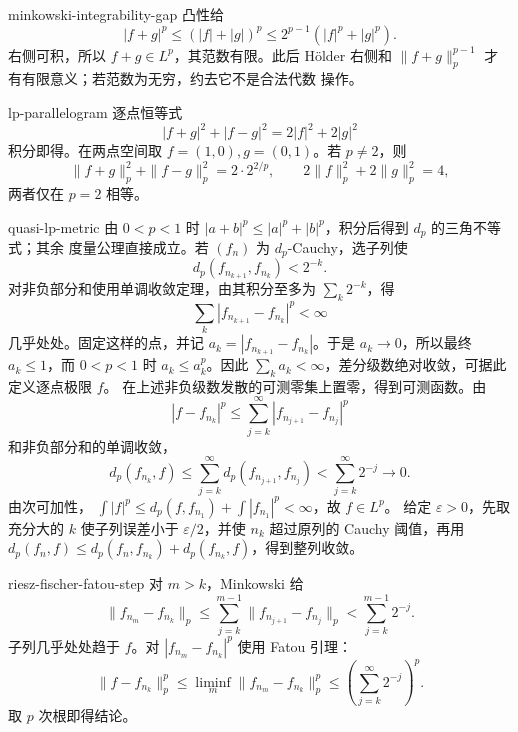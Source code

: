 \begin{solution}{minkowski-integrability-gap}
凸性给
\[
 |f+g|^p\le(|f|+|g|)^p
 \le2^{p-1}(|f|^p+|g|^p).
\]
右侧可积，所以 \(f+g\in L^p\)，其范数有限。此后 Hölder 右侧和
\(\|f+g\|_p^{p-1}\) 才有有限意义；若范数为无穷，约去它不是合法代数
操作。
\end{solution}

\begin{solution}{lp-parallelogram}
逐点恒等式
\[
 |f+g|^2+|f-g|^2=2|f|^2+2|g|^2
\]
积分即得。在两点空间取 \(f=(1,0),g=(0,1)\)。若 \(p\ne2\)，则
\[
 \|f+g\|_p^2+\|f-g\|_p^2=2\cdot2^{2/p},
\qquad
 2\|f\|_p^2+2\|g\|_p^2=4,
\]
两者仅在 \(p=2\) 相等。
\end{solution}

\begin{solution}{quasi-lp-metric}
由 \(0<p<1\) 时
\(|a+b|^p\le|a|^p+|b|^p\)，积分后得到 \(d_p\) 的三角不等式；其余
度量公理直接成立。若 \((f_n)\) 为 \(d_p\)-Cauchy，选子列使
\[
 d_p(f_{n_{k+1}},f_{n_k})<2^{-k}.
\]
对非负部分和使用单调收敛定理，由其积分至多为 \(\sum_k2^{-k}\)，得
\[
 \sum_k|f_{n_{k+1}}-f_{n_k}|^p<\infty
\]
几乎处处。固定这样的点，并记
\(a_k=|f_{n_{k+1}}-f_{n_k}|\)。于是 \(a_k\to0\)，所以最终
\(a_k\le1\)，而 \(0<p<1\) 时 \(a_k\le a_k^p\)。因此
\(\sum_ka_k<\infty\)，差分级数绝对收敛，可据此定义逐点极限 \(f\)。
在上述非负级数发散的可测零集上置零，得到可测函数。由
\[
 |f-f_{n_k}|^p
 \le\sum_{j=k}^{\infty}|f_{n_{j+1}}-f_{n_j}|^p
\]
和非负部分和的单调收敛，
\[
 d_p(f_{n_k},f)
 \le\sum_{j=k}^{\infty}d_p(f_{n_{j+1}},f_{n_j})
 <\sum_{j=k}^{\infty}2^{-j}\longrightarrow0.
\]
由次可加性，
\(\int|f|^p\le d_p(f,f_{n_1})+\int|f_{n_1}|^p<\infty\)，故 \(f\in L^p\)。
给定 \(\varepsilon>0\)，先取充分大的 \(k\) 使子列误差小于
\(\varepsilon/2\)，并使 \(n_k\) 超过原列的 Cauchy 阈值，再用
\(d_p(f_n,f)\le d_p(f_n,f_{n_k})+d_p(f_{n_k},f)\)，得到整列收敛。
\end{solution}

\begin{solution}{riesz-fischer-fatou-step}
对 \(m>k\)，Minkowski 给
\[
 \|f_{n_m}-f_{n_k}\|_p
 \le\sum_{j=k}^{m-1}\|f_{n_{j+1}}-f_{n_j}\|_p
 <\sum_{j=k}^{m-1}2^{-j}.
\]
子列几乎处处趋于 \(f\)。对
\(|f_{n_m}-f_{n_k}|^p\) 使用 Fatou 引理：
\[
 \|f-f_{n_k}\|_p^p
 \le\liminf_m\|f_{n_m}-f_{n_k}\|_p^p
 \le\left(\sum_{j=k}^{\infty}2^{-j}\right)^p.
\]
取 \(p\) 次根即得结论。
\end{solution}

